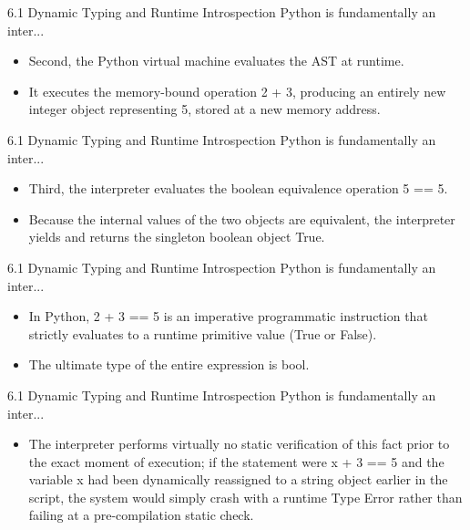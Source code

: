 \documentclass[10pt]{beamer}
\begin{document}
\begin{frame}{6.1 Dynamic Typing and Runtime Introspection Python is fundamentally an inter...}
\begin{itemize}\setlength{\itemsep}{1.5em}
  \item Second, the Python virtual machine evaluates the AST at runtime.
  \item It executes the memory-bound operation 2 + 3, producing an entirely new integer object representing 5, stored at a new memory address.
\end{itemize}
\end{frame}

\begin{frame}{6.1 Dynamic Typing and Runtime Introspection Python is fundamentally an inter...}
\begin{itemize}\setlength{\itemsep}{1.5em}
  \item Third, the interpreter evaluates the boolean equivalence operation 5 == 5.
  \item Because the internal values of the two objects are equivalent, the interpreter yields and returns the singleton boolean object True.
\end{itemize}
\end{frame}

\begin{frame}{6.1 Dynamic Typing and Runtime Introspection Python is fundamentally an inter...}
\begin{itemize}\setlength{\itemsep}{1.5em}
  \item In Python, 2 + 3 == 5 is an imperative programmatic instruction that strictly evaluates to a runtime primitive value (True or False).
  \item The ultimate type of the entire expression is bool.
\end{itemize}
\end{frame}

\begin{frame}{6.1 Dynamic Typing and Runtime Introspection Python is fundamentally an inter...}
\begin{itemize}\setlength{\itemsep}{1.5em}
  \item The interpreter performs virtually no static verification of this fact prior to the exact moment of execution; if the statement were x + 3 == 5 and the variable x had been dynamically reassigned to a string object earlier in the script, the system would simply crash with a runtime Type Error rather than failing at a pre-compilation static check.
\end{itemize}
\end{frame}
\end{document}
